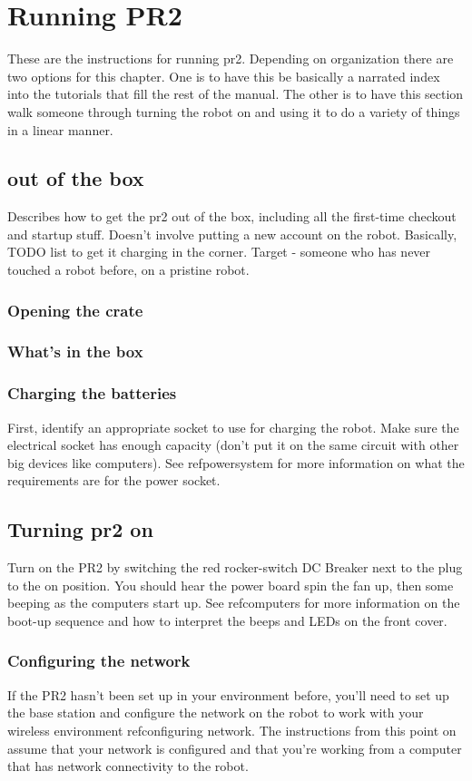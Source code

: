 \chapter{Running PR2}
These are the instructions for running pr2.  Depending on organization there are two options for this chapter.  One is to have this be basically a narrated index into the tutorials that fill the rest of the manual.  The other is to have this section walk someone through turning the robot on and using it to do a variety of things in a linear manner.
\section{out of the box}
Describes how to get the pr2 out of the box, including all the first-time checkout and startup stuff.  Doesn't involve putting a new account on the robot.  Basically, TODO list to get it charging in the corner. Target - someone who has never touched a robot before, on a pristine robot.
\subsection{Opening the crate}
\subsection{What's in the box}
\subsection{Charging the batteries}
First, identify an appropriate socket to use for charging the robot.  Make sure the electrical socket has enough capacity (don't put it on the same circuit with other big devices like computers).   See ref{powersystem} for more information on what the requirements are for the power socket.

\section{Turning pr2 on}
Turn on the PR2 by switching the red rocker-switch DC Breaker next to the plug to the on position.  You should hear the power board spin the fan up, then some beeping as the computers start up.  See ref{computers} for more information on the boot-up sequence and how to interpret the beeps and LEDs on the front cover.

\subsection{Configuring the network}
If the PR2 hasn't been set up in your environment before, you'll need to set up the base station and configure the network on the robot to work with your wireless environment ref{configuring network}.  The instructions from this point on assume that your network is configured and that you're working from a computer that has network connectivity to the robot.

